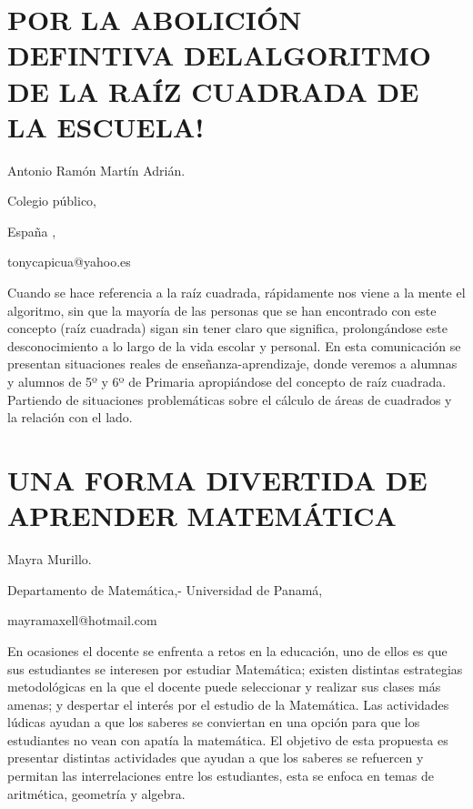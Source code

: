 \section{POR LA ABOLICIÓN DEFINTIVA DELALGORITMO DE LA RAÍZ CUADRADA DE LA
ESCUELA! }

\begin{datos}

Antonio Ramón Martín Adrián.

Colegio público,

España ,

tonycapicua@yahoo.es

\end{datos}

Cuando se hace referencia a la raíz cuadrada, rápidamente nos viene
a la mente el algoritmo, sin que la mayoría de las personas que se
han encontrado con este concepto (raíz cuadrada) sigan sin tener claro
que significa, prolongándose este desconocimiento a lo largo de la
vida escolar y personal. En esta comunicación se presentan situaciones
reales de enseñanza-aprendizaje, donde veremos a alumnas y alumnos
de 5º y 6º de Primaria apropiándose del concepto de raíz cuadrada.
Partiendo de situaciones problemáticas sobre el cálculo de áreas de
cuadrados y la relación con el lado.

\setcounter{section}{24}


\section{UNA FORMA DIVERTIDA DE APRENDER MATEMÁTICA}

\begin{datos}

Mayra Murillo.

Departamento de Matemática,- Universidad de Panamá,

mayramaxell@hotmail.com

\end{datos}

En ocasiones el docente se enfrenta a retos en la educación, uno de
ellos es que sus estudiantes se interesen por estudiar Matemática;
existen distintas estrategias metodológicas en la que el docente puede
seleccionar y realizar sus clases más amenas; y despertar el interés
por el estudio de la Matemática. Las actividades lúdicas ayudan a
que los saberes se conviertan en una opción para que los estudiantes
no vean con apatía la matemática. El objetivo de esta propuesta es
presentar distintas actividades que ayudan a que los saberes se refuercen
y permitan las interrelaciones entre los estudiantes, esta se enfoca
en temas de aritmética, geometría y algebra.


